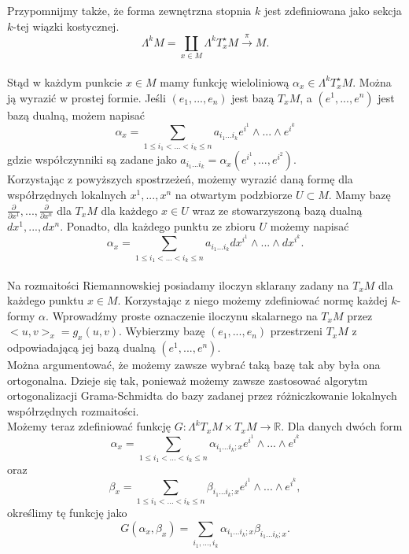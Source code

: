 \documentclass[licencjacka]{pracamgr}
\theoremstyle{definition}
\theoremstyle{definition}
\theoremstyle{plain}
\theoremstyle{plain}
\theoremstyle{plain}
\begin{document}
Przypomnijmy także, że forma zewnętrzna stopnia $k$ jest zdefiniowana jako 
sekcja $k$-tej wiązki kostycznej.
\[
    \Lambda^k M = \coprod_{x \in M} 
    \Lambda^k T_x^\star M \xrightarrow{\pi} M.
\] \\

Stąd w każdym punkcie $x \in M$ mamy funkcję wieloliniową $\alpha_x \in
\Lambda^k T_x^\star M$. Można ją wyrazić w prostej formie.
Jeśli $(e_1, ..., e_n)$ jest bazą $T_x M$, a  $(e^1, ..., e^n)$ jest bazą dualną,
możem napisać
\[
    \alpha_x = \sum_{1 \leq i_1 < ... < i_k \leq n} a_{i_1 ... i_k} e^{i^1} \wedge ...
    \wedge e^{i^k}
\] 
gdzie współczynniki są zadane jako
$a_{i_1 ... i_k} = \alpha_x(e^{i^1}, ..., e^{i^2})$. \\

Korzystając z powyższych spostrzeżeń, możemy wyrazić daną formę dla 
współrzędnych lokalnych $x^1, ..., x^n$
na otwartym podzbiorze $U \subset M$.  Mamy bazę
$\frac{\partial}{\partial x^1}, ..., \frac{\partial}{\partial x^n}$ dla $T_x M$
dla każdego $x \in U$ wraz ze stowarzyszoną bazą dualną $dx^1, ..., dx^n$.
Ponadto, dla każdego punktu ze zbioru $U$ możemy napisać
\[
    \alpha_x = \sum_{1 \leq i_1 < ... < i_k \leq n} a_{i_1 ... i_k}
       dx^{i^1} \wedge ...  \wedge dx^{i^k}.
\]  \\

Na rozmaitości Riemannowskiej posiadamy iloczyn sklarany zadany na 
$T_x M$ dla każdego punktu $x \in M$.
Korzystając z niego możemy zdefiniować normę każdej $k$-formy
$\alpha$.  Wprowadźmy proste oznaczenie iloczynu skalarnego na $T_x M$
przez $<u, v>_x = g_x(u, v)$.
Wybierzmy bazę $(e_1, ..., e_n)$ przestrzeni $T_x M$ z odpowiadającą
jej bazą dualną $(e^1, ..., e^n)$. \\

Można argumentować, że możemy zawsze wybrać taką bazę tak aby była ona
ortogonalna.  Dzieje się tak, ponieważ możemy zawsze zastosować
algorytm ortogonalizacji Grama-Schmidta do bazy zadanej przez
różniczkowanie lokalnych współrzędnych rozmaitości. \\

Możemy teraz zdefiniować funkcję
$G: \Lambda^k T_x M \times T_x M \rightarrow \mathbb{R}$.
Dla danych dwóch form
\[
\alpha_x = \sum_{1 \leq i_1 < ... < i_k \leq n} \alpha_{i_1 ... i_k; x} e^{i^1}
\wedge ...  \wedge e^{i^k}
\]
 oraz
\[ \beta_x = \sum_{1 \leq i_1 < ... < i_k \leq n} \beta_{i_1 ... i_k; x} e^{i^1}
\wedge ...  \wedge e^{i^k},
\]
określimy tę funkcję jako
\[
    G(\alpha_x, \beta_x) = \sum_{i_1, ..., i_k} \alpha_{i_1 ... i_k; x}
                                                    \beta_{i_1 ... i_k; x}.
\] \\
\end{document}
